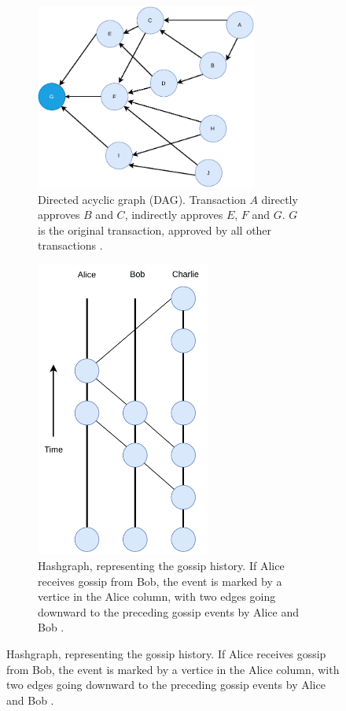   \begin{figure}
    \centering
    \begin{subfigure}[b]{0.48\textwidth}
        \centering
        \includegraphics[width=0.8\textwidth]{Images/DAG.pdf}
        \caption{Directed acyclic graph (DAG). Transaction $A$ directly approves $B$ and $C$, indirectly approves $E$, $F$ and $G$. $G$ is the original transaction,
        approved by all other transactions \cite{Popov2017}.}
        \label{F_DAG}
    \end{subfigure}
    \hfill
    \begin{subfigure}[b]{0.38\textwidth}
        \centering
        \includegraphics[width=0.63\textwidth]{Images/hashgraph.pdf}
        \caption{Hashgraph, representing the gossip history. If Alice receives gossip from Bob,
         the event is marked by a vertice in the Alice column, with two edges going downward
        to the preceding gossip events by Alice and Bob \cite{Baird2018}.}
        \label{F_hashgraph}
    \end{subfigure}
    \hfill


\end{figure}
